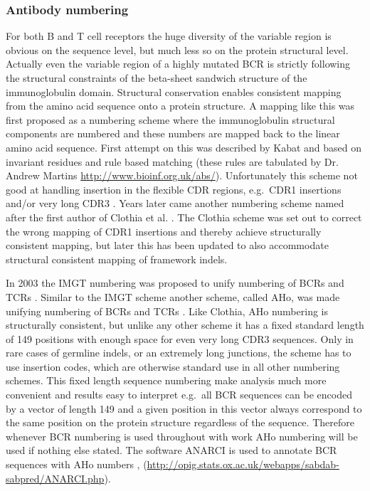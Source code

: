 \subsubsection{Antibody numbering}
For both B and T cell receptors the huge diversity of the variable region is obvious on the sequence level, but much less so on the protein structural level.
Actually even the variable region of a highly mutated BCR is strictly following the structural constraints of the beta-sheet sandwich structure of the immunoglobulin domain.
Structural conservation enables consistent mapping from the amino acid sequence onto a protein structure.
A mapping like this was first proposed as a numbering scheme where the immunoglobulin structural components are numbered and these numbers are mapped back to the linear amino acid sequence.
First attempt on this was described by Kabat \cite{national1983sequences} and based on invariant residues and rule based matching (these rules are tabulated by Dr. Andrew Martins \url{http://www.bioinf.org.uk/abs/}).
Unfortunately this scheme not good at handling insertion in the flexible CDR regions, e.g.\ CDR1 insertions and/or very long CDR3 \cite{martin2010protein}.
Years later came another numbering scheme named after the first author of Clothia et al. \cite{chothia1987canonical}.
The Clothia scheme was set out to correct the wrong mapping of CDR1 insertions and thereby achieve structurally consistent mapping, but later this has been updated to also accommodate structural consistent mapping of framework indels.

In 2003 the IMGT numbering was proposed to unify numbering of BCRs and TCRs \cite{lefranc2003imgt}.
Similar to the IMGT scheme another scheme, called AHo, was made unifying numbering of BCRs and TCRs \cite{honegger2001yet}.
Like Clothia, AHo numbering is structurally consistent, but unlike any other scheme it has a fixed standard length of 149 positions with enough space for even very long CDR3 sequences.
Only in rare cases of germline indels, or an extremely long junctions, the scheme has to use insertion codes, which are otherwise standard use in all other numbering schemes.
This fixed length sequence numbering make analysis much more convenient and results easy to interpret e.g.\ all BCR sequences can be encoded by a vector of length 149 and a given position in this vector always correspond to the same position on the protein structure regardless of the sequence.
Therefore whenever BCR numbering is used throughout with work AHo numbering will be used if nothing else stated.
The software ANARCI is used to annotate BCR sequences with AHo numbers \cite{dunbar2016anarci}, (\url{http://opig.stats.ox.ac.uk/webapps/sabdab-sabpred/ANARCI.php}).

